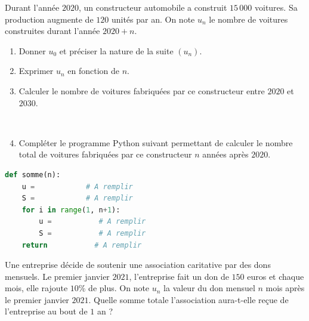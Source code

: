 \documentclass[11pt]{article}
\begin{document}
\begin{app}
  Durant l'année $2020$, un constructeur automobile a construit $15\,000$
  voitures. Sa production augmente de $120$ unités par an. On note $u_n$ le
  nombre de voitures construites durant l'année $2020+n$.
  \begin{enumerate}
    \item Donner $u_0$ et préciser la nature de la suite $\left( u_n
      \right)$.
    \item Exprimer $u_n$ en fonction de $n$.
    \item Calculer le nombre de voitures fabriquées par ce constructeur entre
      $2020$ et $2030$.
  \end{enumerate}~\\[-8mm]
  \begin{minipage}[t]{.5\textwidth}
  \begin{enumerate}
      \setcounter{enumi}{3}
    \item Compléter le programme Python suivant permettant de calculer le nombre
      total de voitures fabriquées par ce constructeur $n$ années après $2020$.
  \end{enumerate}
  \end{minipage}
  \hfill
  \begin{minipage}[t]{.4\textwidth}
    \begin{center}
\begin{lstlisting}[language=Python]
def somme(n):
    u =            # A remplir
    S =            # A remplir
    for i in range(1, n+1):
        u =           # A remplir
        S =           # A remplir
    return           # A remplir
\end{lstlisting}
    \end{center}
  \end{minipage}
\end{app}
\begin{app}
  Une entreprise décide de soutenir une association caritative par des dons
  mensuels. Le premier janvier $2021$, l'entreprise fait un don de $150$ euros
  et chaque mois, elle rajoute $10$\% de plus. On note $u_n$ la valeur du don
  mensuel $n$ mois après le premier janvier $2021$. Quelle somme totale
  l'association aura-t-elle reçue de l'entreprise au bout de $1$ an ?
\end{app}
\end{document}
